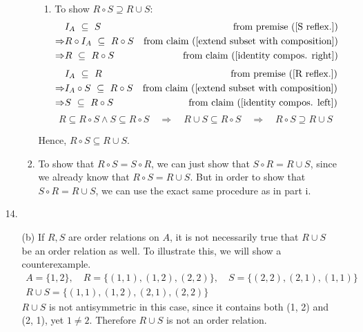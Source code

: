 \documentclass[fleqn]{article}
\begin{document}
\begin{enumerate}
\begin{enumerate}
\begin{enumerate}
\begin{enumerate}
				\item %
				To show \(R \circ S \supseteq R \cup S\):
				\begin{align*}
					& I_A \ \subseteq \ S & \text{from premise (\ref{S reflex.})} \\
					\Rightarrow & R \circ I_A \ \subseteq \ R \circ S & \text{from claim (\ref{extend subset with composition})} \\
					\Rightarrow & R \ \subseteq \ R \circ S & \text{from claim (\ref{identity compos. right})}
				\end{align*}
				\begin{align*}
					& I_A \ \subseteq \ R & \text{from premise (\ref{R reflex.})} \\
					\Rightarrow & I_A \circ S \ \subseteq \ R \circ S & \text{from claim (\ref{extend subset with composition})} \\
					\Rightarrow & S \ \subseteq \ R \circ S & \text{from claim (\ref{identity compos. left})}
				\end{align*}
				\[R \subseteq R \circ S \land S \subseteq R \circ S \quad \Rightarrow \quad R \cup S \subseteq R \circ S \quad \Rightarrow \quad R \circ S \supseteq R \cup S\]
			\end{enumerate}
			Hence, \(R \circ S \subseteq R \cup S\).

			\item %
			To show that \(R \circ S = S \circ R\), we can just show that \(S \circ R = R \cup S\), since we already know that \(R \circ S = R \cup S\). But in order to show that \(S \circ R = R \cup S\), we can use the exact same procedure as in part i.
		\end{enumerate}
	\end{enumerate}
	
	\item[14.]
	\begin{enumerate}
		\item[(b)]
		If \(R, S\) are order relations on \(A\), it is not necessarily true that \(R \cup S\) be an order relation as well. To illustrate this, we will show a counterexample.
		\begin{gather*}
			A = \{1, 2\}, \quad R = \{(1, 1), (1, 2), (2, 2)\}, \quad S = \{(2, 2), (2, 1), (1, 1)\} \\
			R \cup S = \{(1, 1), (1, 2), (2, 1), (2, 2)\}
		\end{gather*}
		\(R \cup S\) is not antisymmetric in this case, since it contains both (1, 2) and (2, 1), yet \(1 \neq 2\). Therefore \(R \cup S\) is not an order relation.
	\end{enumerate}
	
	
\end{enumerate}
    
\end{document}
